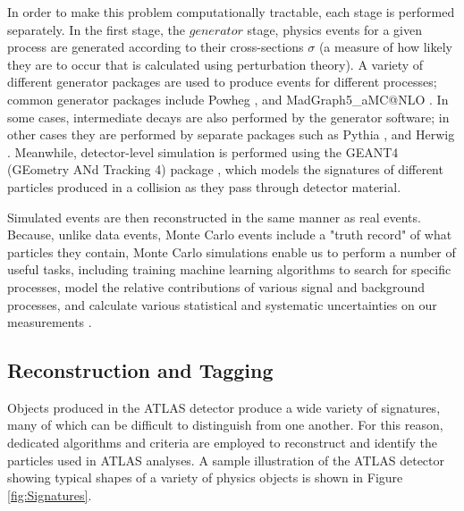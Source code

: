In order to make this problem computationally tractable, each stage is performed separately. In the first stage, the $generator$ stage, physics events for a given process are generated according to their cross-sections $\sigma$ (a measure of how likely they are to occur that is calculated using perturbation theory). A variety of different generator packages are used to produce events for different processes; common generator packages include Powheg \cite{Powheg}, and {MadGraph5\_aMC@NLO} \cite{MG5}. In some cases, intermediate decays are also performed by the generator software; in other cases they are performed by separate packages such as Pythia \cite{Pythia8.1} \cite{Pythia8.2}, and Herwig \cite{Herwig}. Meanwhile, detector-level simulation is performed using the GEANT4 (GEometry ANd Tracking 4) package \cite{GEANT4}, which models the signatures of different particles produced in a collision as they pass through detector material.

Simulated events are then reconstructed in the same manner as real events. Because, unlike data events, Monte Carlo events include a "truth record" of what particles they contain, Monte Carlo simulations enable us to perform a number of useful tasks, including training machine learning algorithms to search for specific processes, model the relative contributions of various signal and background processes, and calculate various statistical and systematic uncertainties on our measurements \cite{Aad_2010}.

\subsection{Reconstruction and Tagging} \label{sec:Reco} 

Objects produced in the ATLAS detector produce a wide variety of signatures, many of which can be difficult to distinguish from one another. For this reason, dedicated algorithms and criteria are employed to reconstruct and identify the particles used in ATLAS analyses. A sample illustration of the ATLAS detector showing typical shapes of a variety of physics objects is shown in Figure \ref{fig:Signatures}.

